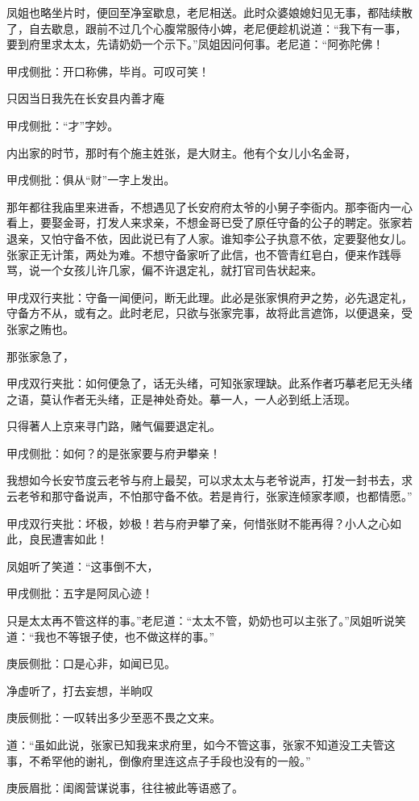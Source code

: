 \begin{parag}


    凤姐也略坐片时，便回至净室歇息，老尼相送。此时众婆娘媳妇见无事，都陆续散了，自去歇息，跟前不过几个心腹常服侍小婢，老尼便趁机说道：“我下有一事，要到府里求太太，先请奶奶一个示下。”凤姐因问何事。老尼道：“阿弥陀佛！\begin{note}甲戌侧批：开口称佛，毕肖。可叹可笑！\end{note}只因当日我先在长安县内善才庵\begin{note}甲戌侧批：“才”字妙。\end{note}内出家的时节，那时有个施主姓张，是大财主。他有个女儿小名金哥，\begin{note}甲戌侧批：俱从“财”一字上发出。\end{note}那年都往我庙里来进香，不想遇见了长安府府太爷的小舅子李衙内。那李衙内一心看上，要娶金哥，打发人来求亲，不想金哥已受了原任守备的公子的聘定。张家若退亲，又怕守备不依，因此说已有了人家。谁知李公子执意不依，定要娶他女儿。张家正无计策，两处为难。不想守备家听了此信，也不管青红皂白，便来作践辱骂，说一个女孩儿许几家，偏不许退定礼，就打官司告状起来。\begin{note}甲戌双行夹批：守备一闻便问，断无此理。此必是张家惧府尹之势，必先退定礼，守备方不从，或有之。此时老尼，只欲与张家完事，故将此言遮饰，以便退亲，受张家之贿也。\end{note}那张家急了，\begin{note}甲戌双行夹批：如何便急了，话无头绪，可知张家理缺。此系作者巧摹老尼无头绪之语，莫认作者无头绪，正是神处奇处。摹一人，一人必到纸上活现。\end{note}只得著人上京来寻门路，赌气偏要退定礼。\begin{note}甲戌侧批：如何？的是张家要与府尹攀亲！\end{note}我想如今长安节度云老爷与府上最契，可以求太太与老爷说声，打发一封书去，求云老爷和那守备说声，不怕那守备不依。若是肯行，张家连倾家孝顺，也都情愿。”\begin{note}甲戌双行夹批：坏极，妙极！若与府尹攀了亲，何惜张财不能再得？小人之心如此，良民遭害如此！\end{note}
\end{parag}


\begin{parag}


    凤姐听了笑道：“这事倒不大，\begin{note}甲戌侧批：五字是阿凤心迹！\end{note}只是太太再不管这样的事。”老尼道：“太太不管，奶奶也可以主张了。”凤姐听说笑道：“我也不等银子使，也不做这样的事。”\begin{note}庚辰侧批：口是心非，如闻已见。\end{note}净虚听了，打去妄想，半晌叹\begin{note}庚辰侧批：一叹转出多少至恶不畏之文来。\end{note}道：“虽如此说，张家已知我来求府里，如今不管这事，张家不知道没工夫管这事，不希罕他的谢礼，倒像府里连这点子手段也没有的一般。”\begin{note}庚辰眉批：闺阁营谋说事，往往被此等语惑了。\end{note}
\end{parag}


